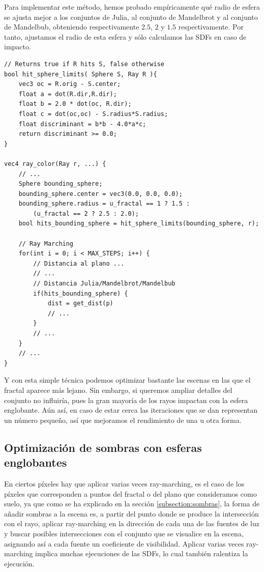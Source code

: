 Para implementar este método, hemos probado empíricamente qué radio de esfera se ajusta mejor a los conjuntos de Julia, al conjunto de Mandelbrot y al conjunto de Mandelbub, obteniendo respectivamente $2.5$, $2$ y $1.5$ respectivamente. Por tanto, ajustamos el radio de esta esfera y sólo calculamos las SDFs en caso de impacto.

\begin{lstlisting}
// Returns true if R hits S, false otherwise
bool hit_sphere_limits( Sphere S, Ray R ){
    vec3 oc = R.orig - S.center;
    float a = dot(R.dir,R.dir);
    float b = 2.0 * dot(oc, R.dir);
	float c = dot(oc,oc) - S.radius*S.radius;
    float discriminant = b*b - 4.0*a*c;
    return discriminant >= 0.0;
}

vec4 ray_color(Ray r, ...) {
    // ... 
    Sphere bounding_sphere;
    bounding_sphere.center = vec3(0.0, 0.0, 0.0);
    bounding_sphere.radius = u_fractal == 1 ? 1.5 : 
        (u_fractal == 2 ? 2.5 : 2.0);
    bool hits_bounding_sphere = hit_sphere_limits(bounding_sphere, r);
    
    // Ray Marching
    for(int i = 0; i < MAX_STEPS; i++) {
        // Distancia al plano ... 
        // ... 
        // Distancia Julia/Mandelbrot/Mandelbub
        if(hits_bounding_sphere) {
            dist = get_dist(p)
            // ... 
        }
        // ... 
    }
    // ...
}
\end{lstlisting}

Y con esta simple técnica podemos optimizar bastante las escenas en las que el fractal aparece más lejano. Sin embargo, si queremos ampliar detalles del conjunto no influiría, pues la gran mayoría de los rayos impactan con la esfera englobante. Aún así, en caso de estar cerca las iteraciones que se dan representan un número pequeño, así que mejoramos el rendimiento de una u otra forma.

\subsection{Optimización de sombras con esferas englobantes}

En ciertos píxeles hay que aplicar varias veces ray-marching, es el caso de los píxeles que corresponden a puntos del fractal o del plano que consideramos como suelo, ya que como se ha explicado en la sección \ref{subsection:sombras}, la forma de añadir sombras a la escena es, a partir del punto donde se produce la intersección con el rayo, aplicar ray-marching en la dirección de cada una de las fuentes de luz y buscar posibles intersecciones con el conjunto que se visualice en la escena, asignando así a cada fuente un coeficiente de visibilidad. Aplicar varias veces ray-marching implica muchas ejecuciones de las SDFs, lo cual también ralentiza la ejecución. 

